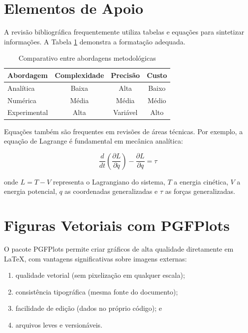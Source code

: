 \section{Elementos de Apoio}

A revisão bibliográfica frequentemente utiliza tabelas e equações para sintetizar informações. A Tabela \ref{tab:exemplo} demonstra a formatação adequada.

\begin{table}[ht]
\caption{Comparativo entre abordagens metodológicas}
\label{tab:exemplo}
\centering
\begin{tabular}{lccc}
    \hline
    Abordagem & Complexidade & Precisão & Custo \\
    \hline
    Analítica & Baixa & Alta & Baixo \\
    Numérica & Média & Média & Médio \\
    Experimental & Alta & Variável & Alto \\
    \hline
\end{tabular}
\end{table}

Equações também são frequentes em revisões de áreas técnicas. Por exemplo, a equação de Lagrange é fundamental em mecânica analítica:

\begin{equation} \label{eq:lagrange}
\frac{d}{dt}\left(\frac{\partial L}{\partial \dot{q}}\right) - \frac{\partial L}{\partial q} = \tau
\end{equation}

\noindent onde $L = T - V$ representa o Lagrangiano do sistema, $T$ a energia cinética, $V$ a energia potencial, $q$ as coordenadas generalizadas e $\tau$ as forças generalizadas.

\section{Figuras Vetoriais com PGFPlots}

O pacote PGFPlots permite criar gráficos de alta qualidade diretamente em \LaTeX{}, com vantagens significativas sobre imagens externas:

\begin{enumerate}
    \item qualidade vetorial (sem pixelização em qualquer escala);
    \item consistência tipográfica (mesma fonte do documento);
    \item facilidade de edição (dados no próprio código); e
    \item arquivos leves e versionáveis.
\end{enumerate}

